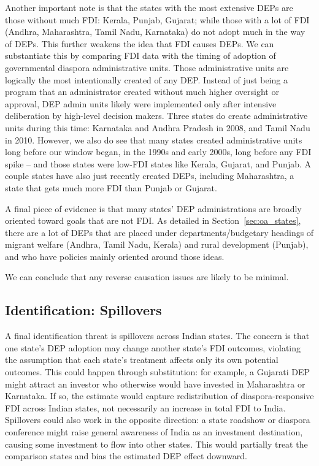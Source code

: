 \documentclass[12pt]{article}
\let\oldsubsection\subsection
\renewcommand{\subsection}{\FloatBarrier\oldsubsection}
\begin{document}
Another important note is that the states with the most extensive DEPs are those without much FDI: Kerala, Punjab, Gujarat; while those with a lot of FDI (Andhra, Maharashtra, Tamil Nadu, Karnataka) do not adopt much in the way of DEPs. This further weakens the idea that FDI causes DEPs.
We can substantiate this by comparing FDI data with the timing of adoption of governmental diaspora administrative units. Those administrative units are logically the most intentionally created of any DEP. Instead of just being a program that an administrator created without much higher oversight or approval, DEP admin units likely were implemented only after intensive deliberation by high-level decision makers. Three states do create administrative units during this time: Karnataka and Andhra Pradesh in 2008,  and Tamil Nadu in 2010. However, we also do see that many states created administrative units long before our window began, in the 1990s and early 2000s, long before any FDI spike -- and those states were low-FDI states like Kerala, Gujarat, and Punjab. A couple states have also just recently created DEPs, including Maharashtra, a state that gets much more FDI than Punjab or Gujarat. 

A final piece of evidence is that many states' DEP administrations are broadly oriented toward goals that are not FDI. As detailed in Section~\ref{sec:oa_states}, there are a lot of DEPs that are placed under departments/budgetary headings of migrant welfare (Andhra, Tamil Nadu, Kerala) and rural development (Punjab), and who have policies mainly oriented around those ideas. 

We can conclude that any reverse causation issues are likely to be minimal.


\subsection{Identification: Spillovers} \label{ss:spillovers}

A final identification threat is spillovers across Indian states. The concern is that one state's DEP adoption may change another state's FDI outcomes, violating the assumption that each state's treatment affects only its own potential outcomes. This could happen through substitution: for example, a Gujarati DEP might attract an investor who otherwise would have invested in Maharashtra or Karnataka. If so, the estimate would capture redistribution of diaspora-responsive FDI across Indian states, not necessarily an increase in total FDI to India. Spillovers could also work in the opposite direction: a state roadshow or diaspora conference might raise general awareness of India as an investment destination, causing some investment to flow into other states. This would partially treat the comparison states and bias the estimated DEP effect downward.
\end{document}
